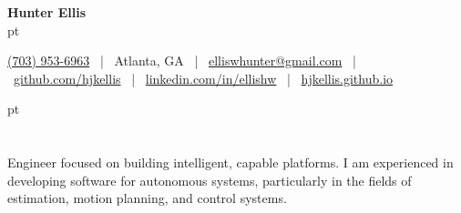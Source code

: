 \documentclass[10pt, letterpaper]{extarticle}
\let\hrefWithoutArrow\href
\begin{document}
\newcommand{\AND}{\unskip
    \cleaders\copy\ANDbox\hskip\wd\ANDbox
    \ignorespaces
}
\newsavebox\ANDbox
\sbox\ANDbox{$|$}
\LARGE{\textbf{{Hunter Ellis}}}\\
 pt%

\normalsize
\hrefWithoutArrow{tel:+1-703-953-6963}{(703) 953-6963} \ |
\ Atlanta, GA \ |
\ \hrefWithoutArrow{mailto:elliswhunter@gmail.com}{elliswhunter@gmail.com} \ |
\ \hrefWithoutArrow{https://github.com/hjkellis}{{github.com/hjkellis}} \ |
\ \hrefWithoutArrow{https://www.linkedin.com/in/ellishw/}{linkedin.com/in/ellishw} \ |
\ \hrefWithoutArrow{https://hjkellis.github.io}{{hjkellis.github.io}}
\normalsize

 pt%
\section{}
Engineer focused on building intelligent, capable platforms. I am experienced in developing software for autonomous systems, particularly in the  fields of estimation, motion planning, and control systems.\\
\end{document}
